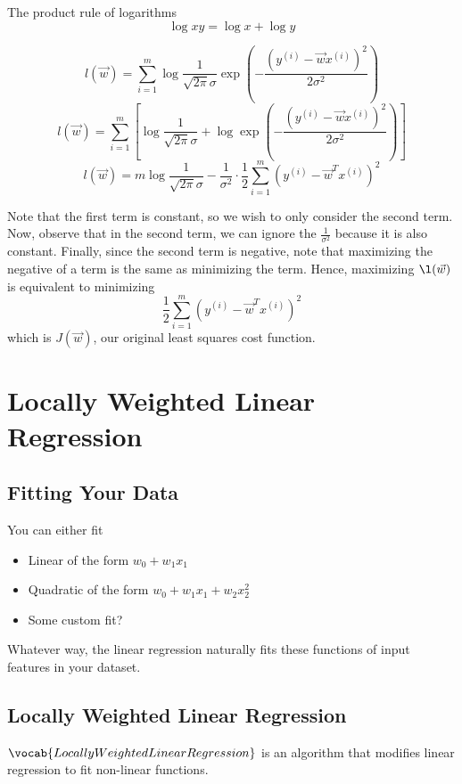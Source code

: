 \documentclass[12pt]{scrartcl}
\begin{document}
\begin{note}
    The product rule of logarithms
    \[\log xy = \log x + \log y\]
\end{note}
\[l(\vec{w}) = \sum_{i=1}^m \log \frac{1}{\sqrt{2\pi}\sigma }\exp(-\frac{(y^{(i)} - \vec{w}x^{(i)})^2}{2\sigma^2})\]
\[l(\vec{w}) = \sum_{i=1}^m \left[\log \frac{1}{\sqrt{2\pi}\sigma } + \log \exp(-\frac{(y^{(i)} - \vec{w}x^{(i)})^2}{2\sigma^2})\right]\]
\[l(\vec{w}) = m \log \frac{1}{\sqrt{2\pi}\sigma} - \frac{1}{\sigma^2} \cdot \frac{1}{2}\sum_{i=1}^m (y^{(i)} - \vec{w}^Tx^{(i)})^2\]
\begin{note}
    Note that the first term is constant, so we wish to only consider the second term. Now, observe that in the second term, we can ignore the $\frac{1}{\sigma^2}$ because it is also constant. Finally, since the second term is negative, note that maximizing the negative of a term is the same as minimizing the term. Hence, maximizing $\l(\vec{w})$ is equivalent to minimizing
    \[\frac{1}{2}\sum_{i=1}^m(y^{(i)} - \vec{w}^Tx^{(i)})^2\]
    which is $J(\vec{w})$, our original least squares cost function.
\end{note}

\section{Locally Weighted Linear Regression}

\subsection{Fitting Your Data}

You can either fit 
\begin{itemize}
    \item Linear of the form $w_0 + w_1x_1$
    \item Quadratic of the form $w_0 + w_1x_1 + w_2x_2^2$
    \item Some custom fit?
\end{itemize}
Whatever way, the linear regression naturally fits these functions of input features in your dataset.

\subsection{Locally Weighted Linear Regression}
\begin{definition}
    $\vocab{Locally Weighted Linear Regression}$ is an algorithm that modifies linear regression to fit non-linear functions.
\end{definition}
\end{document}
